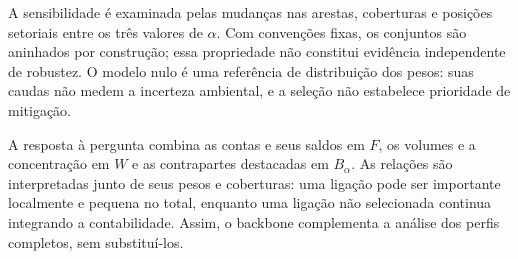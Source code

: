 A sensibilidade é examinada pelas mudanças nas arestas, coberturas e posições setoriais entre os três valores de $\alpha$. Com convenções fixas, os conjuntos são aninhados por construção; essa propriedade não constitui evidência independente de robustez. O modelo nulo é uma referência de distribuição dos pesos: suas caudas não medem a incerteza ambiental, e a seleção não estabelece prioridade de mitigação.

A resposta à pergunta combina as contas e seus saldos em $F$, os volumes e a concentração em $W$ e as contrapartes destacadas em $B_\alpha$. As relações são interpretadas junto de seus pesos e coberturas: uma ligação pode ser importante localmente e pequena no total, enquanto uma ligação não selecionada continua integrando a contabilidade. Assim, o backbone complementa a análise dos perfis completos, sem substituí-los.

